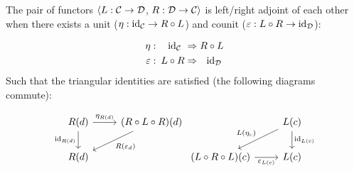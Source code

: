 \begin{definition}
  The pair of functors $\langle L: \mathcal{C}\to \mathcal{D}$, $R: \mathcal{D}\to \mathcal{C}\rangle$ is left/right adjoint of
  each other when there exists a unit ($\eta: \mathrm{id}_{\mathcal{C}}\to R\circ L$) and counit
  ($\varepsilon: L\circ R \to \mathrm{id}_{\mathcal{D}}$):
  \parencite{leinster:basic_category_theory}

  \[
    \begin{aligned}
      \eta:&\!\!\!&\mathrm{id}_{\mathcal{C}}\ &\Rightarrow R \circ L\\
      \varepsilon:&\!\!\!& L \circ R &\Rightarrow\ \ \mathrm{id}_{\mathcal{D}}
    \end{aligned}
  \]
  Such that the triangular identities are satisfied (the following diagrams
  commute):

  \[\begin{tikzcd}[ampersand replacement=\&]
    {R(d)} \& {(R\circ L\circ R)(d)} \\
    {R(d)}
    \arrow["{\eta_{R(d)}}", from=1-1, to=1-2]
    \arrow["{R(\varepsilon_d)}", from=1-2, to=2-1]
    \arrow["{\id_{R(d)}}"', from=1-1, to=2-1]
  \end{tikzcd}
  \begin{tikzcd}[ampersand replacement=\&]
    \& {L(c)} \\
    {(L\circ R\circ L)(c)} \& {L(c)}
    \arrow["{L(\eta_c)}"', from=1-2, to=2-1]
    \arrow["{\varepsilon_{L(c)}}"', from=2-1, to=2-2]
    \arrow["{\id_{L(c)}}", from=1-2, to=2-2]
  \end{tikzcd}
  \]
\end{definition}

